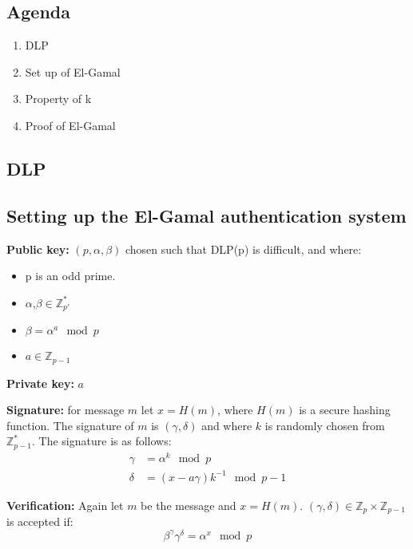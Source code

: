 

\subsection*{Agenda}
\begin{enumerate}
\item DLP
\item Set up of El-Gamal
\item Property of k
\item Proof of El-Gamal
\end{enumerate}
\subsection{DLP}

\subsection{Setting up the El-Gamal authentication system}
\textbf{Public key:} $(p,\alpha,\beta)$ chosen such that DLP(p) is
difficult, and where:
\begin{itemize}
\item p is an odd prime.
\item $\alpha$,$\beta \in \mathbb{Z}_{p'}^*$
\item $\beta = \alpha^a \mod p$
\item $a \in \mathbb{Z}_{p-1} $
\end{itemize}

\textbf{Private key:} $a$

\textbf{Signature:} for message $m$ let $x = H(m)$, where $H(m)$ is a
secure hashing function. The signature of $m$ is $(\gamma,\delta)$ and
where $k$ is randomly chosen from $\mathbb{Z}_{p-1}^*$. The signature
is as follows:
\begin{align*}
  \gamma &= \alpha^k \mod p\\
  \delta &= (x-a\gamma)k^{-1} \mod p-1
\end{align*}

\textbf{Verification:} Again let $m$ be the message and $x =
H(m)$. $(\gamma,\delta) \in \mathbb{Z}_p\times \mathbb{Z}_{p-1}$ is
accepted if:
\[ \beta^{\gamma} \gamma^{\delta}= \alpha^x \mod p\]
